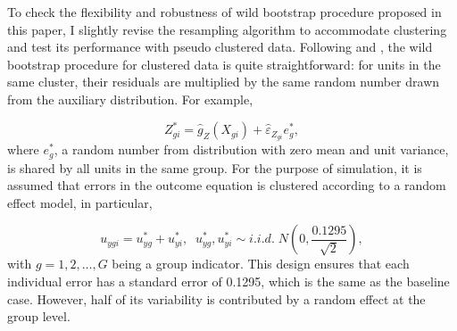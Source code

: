 \documentclass[12pt,]{article}
\DeclareMathOperator{\1}{\mathbbm{1}}
\begin{document}
To check the flexibility and robustness of wild bootstrap procedure proposed in this paper, I slightly revise the resampling algorithm to accommodate clustering and test its performance with pseudo clustered data. Following \cite{brownstone2001bootstrap} and \cite{cameron2008bootstrap}, the wild bootstrap procedure for clustered data is quite straightforward: for units in the same cluster, their residuals are multiplied by the same random number drawn from the auxiliary distribution. For example,

\begin{equation*}
Z_{gi}^{*} = \hat g_Z(X_{gi}) + \hat{\varepsilon}_{Z_{gi}} e_g^*,
\end{equation*}
where $e_g^*$, a random number from distribution with zero mean and unit variance, is shared by all units in the same group. For the purpose of simulation, it is assumed that errors in the outcome equation is clustered according to a random effect model, in particular, 

\begin{equation*}
u_{ygi} = u_{yg}^* + u_{yi}^*, \;\; u_{yg}^*, u_{yi}^* \sim i.i.d. \; N(0, \frac{0.1295}{\sqrt{2}}),
\end{equation*}
with $g = 1, 2, \dots, G$ being a group indicator. This design ensures that each individual error has a standard error of 0.1295, which is the same as the baseline case. However, half of its variability is contributed by a random effect at the group level.
\end{document}
